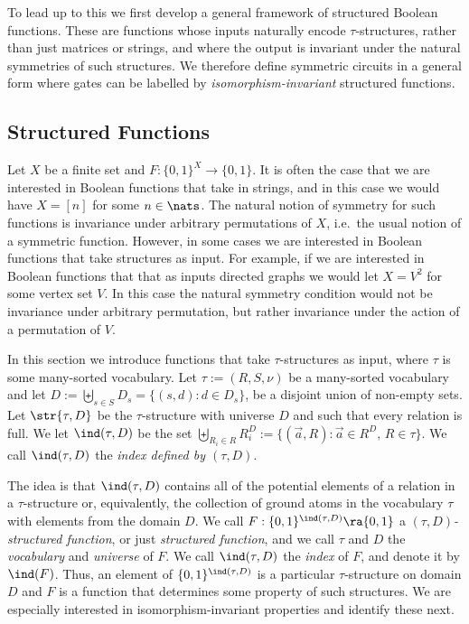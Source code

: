 \documentclass[a4paper,UKenglish]{lipics-v2018}
\begin{document}
To lead up to this we first develop a general framework of structured Boolean
functions. These are functions whose inputs naturally encode $\tau$-structures,
rather than just matrices or strings, and where the output is invariant under
the natural symmetries of such structures. We therefore define symmetric
circuits in a general form where gates can be labelled by
\emph{isomorphism-invariant} structured functions.

\subsection{Structured Functions}
Let $X$ be a finite set and $F: \{0,1\}^X \rightarrow \{0,1\}$. It is often the
case that we are interested in Boolean functions that take in strings, and in
this case we would have $X = [n]$ for some $n \in \nats$. The natural notion of
symmetry for such functions is invariance under arbitrary permutations of $X$,
i.e.\ the usual notion of a symmetric function. However, in some cases we are
interested in Boolean functions that take structures as input. For example, if
we are interested in Boolean functions that that as inputs directed graphs we
would let $X = V^2$ for some vertex set $V$. In this case the natural symmetry
condition would not be invariance under arbitrary permutation, but rather
invariance under the action of a permutation of $V$.

In this section we introduce functions that take $\tau$-structures as input,
where $\tau$ is some many-sorted vocabulary. Let $\tau := (R, S, \nu)$ be a
many-sorted vocabulary and let $D := \biguplus_{s \in S} D_{s} = \{(s,d) : d \in
D_s\}$, be a disjoint union of non-empty sets. Let $\str{\tau, D}$ be the
$\tau$-structure with universe $D$ and such that every relation is full. We
let $\ind (\tau, D)$ be the set $\biguplus_{R_i\in R} R^{D}_i := \{ (\vec{a}, R)
: \vec{a} \in R^{D}, \, R \in \tau \} $. We call $\ind(\tau, D)$ the \emph{index
  defined by $(\tau, D)$}.

The idea is that $\ind(\tau, D)$ contains all of the potential elements of a 
relation in a $\tau$-structure or, equivalently, the collection of
ground atoms in the vocabulary $\tau$ with elements from the domain $D$.  We call $F : \{0,1\}^{\ind(\tau, D)} \ra
\{0,1\}$ a \emph{$(\tau, D)$-structured function}, or just \emph{structured
  function}, and we call $\tau$ and $D$ the \emph{vocabulary} and
\emph{universe} of $F$.  We call $\ind(\tau, D)$ the \emph{index} of $F$, and
denote it by $\ind(F)$.  Thus, an element of $\{0,1\}^{\ind(\tau, D)}$
is a particular $\tau$-structure on domain $D$ and $F$ is a function
that determines some property of such structures.  We are especially
interested in isomorphism-invariant properties and identify these next.
\end{document}
